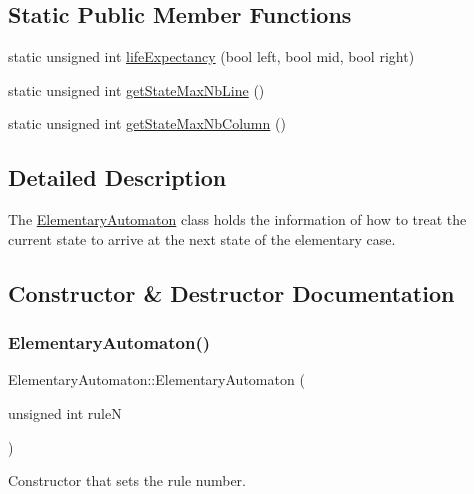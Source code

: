 \subsection*{Static Public Member Functions}
\begin{DoxyCompactItemize}
\item 
static unsigned int \mbox{\hyperlink{class_elementary_automaton_ac4bf850dc1c0e704f91f035cfbac48a7}{life\+Expectancy}} (bool left, bool mid, bool right)
\item 
static unsigned int \mbox{\hyperlink{class_elementary_automaton_adb3f06c908a1550bd236fffe997b0180}{get\+State\+Max\+Nb\+Line}} ()
\item 
static unsigned int \mbox{\hyperlink{class_elementary_automaton_abbe236c9f41be00593ae8f4142f353df}{get\+State\+Max\+Nb\+Column}} ()
\end{DoxyCompactItemize}


\subsection{Detailed Description}
The \mbox{\hyperlink{class_elementary_automaton}{Elementary\+Automaton}} class holds the information of how to treat the current state to arrive at the next state of the elementary case. 

\subsection{Constructor \& Destructor Documentation}
\mbox{\label{class_elementary_automaton_a9593b026bdc4340f9263f73e0732617a}} 
\subsubsection{\texorpdfstring{Elementary\+Automaton()}{ElementaryAutomaton()}\hspace{0.1cm}{\footnotesize\ttfamily [1/2]}}
{\footnotesize\ttfamily Elementary\+Automaton\+::\+Elementary\+Automaton (\begin{DoxyParamCaption}\item[{unsigned int}]{ruleN }\end{DoxyParamCaption})}

Constructor that sets the rule number.



